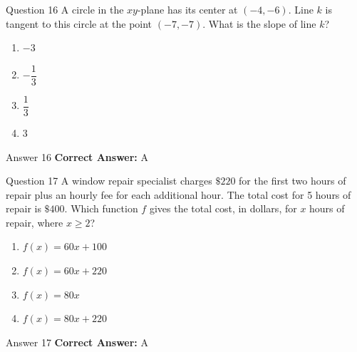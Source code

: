 \documentclass{beamer}
\begin{document}
\begin{frame}{Question 16}
\small
A circle in the \(\displaystyle xy\)-plane has its center at \(\displaystyle (-4, -6)\). Line \(\displaystyle k\) is tangent to this circle at the point \(\displaystyle (-7, -7)\). What is the slope of line \(\displaystyle k\)?
\vspace{0.35cm}
\begin{enumerate}
    \item[A.] \(\displaystyle -3\)
    \item[B.] \(\displaystyle -\dfrac{1}{3}\)
    \item[C.] \(\displaystyle \dfrac{1}{3}\)
    \item[D.] \(\displaystyle 3\)
\end{enumerate}

\end{frame}
\begin{frame}{Answer 16}
\small
\textbf{Correct Answer:} A
\end{frame}

\begin{frame}{Question 17}
\small
A window repair specialist charges \textbf{\(\$220\)} for the first two hours of repair plus an hourly fee for each additional hour. The total cost for 5 hours of repair is \textbf{\(\$400\)}. Which function \( f \) gives the total cost, in dollars, for \( x \) hours of repair, where \( x \geq 2 \)?
\vspace{0.35cm}
\begin{enumerate}
    \item[A.] \(\displaystyle f(x) = 60x + 100\)
    \item[B.] \(\displaystyle f(x) = 60x + 220\)
    \item[C.] \(\displaystyle f(x) = 80x\)
    \item[D.] \(\displaystyle f(x) = 80x + 220\)
\end{enumerate}

\end{frame}
\begin{frame}{Answer 17}
\small
\textbf{Correct Answer:} A
\end{frame}
\end{document}
